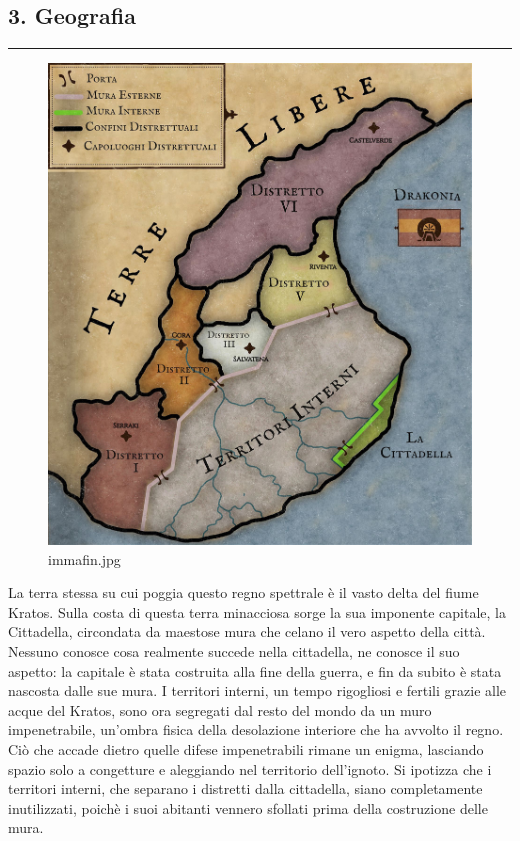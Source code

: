 \subsection{3. Geografia}\label{geografia}

\begin{center}\rule{0.5\linewidth}{0.5pt}\end{center}

\begin{figure}
\centering
\includegraphics{immafin.jpg}
\caption{immafin.jpg}
\end{figure}

La terra stessa su cui poggia questo regno spettrale è il vasto delta
del fiume Kratos. Sulla costa di questa terra minacciosa sorge la sua
imponente capitale, la Cittadella, circondata da maestose mura che
celano il vero aspetto della città. Nessuno conosce cosa realmente
succede nella cittadella, ne conosce il suo aspetto: la capitale è stata
costruita alla fine della guerra, e fin da subito è stata nascosta dalle
sue mura. I territori interni, un tempo rigogliosi e fertili grazie alle
acque del Kratos, sono ora segregati dal resto del mondo da un muro
impenetrabile, un'ombra fisica della desolazione interiore che ha
avvolto il regno. Ciò che accade dietro quelle difese impenetrabili
rimane un enigma, lasciando spazio solo a congetture e aleggiando nel
territorio dell'ignoto. Si ipotizza che i territori interni, che
separano i distretti dalla cittadella, siano completamente inutilizzati,
poichè i suoi abitanti vennero sfollati prima della costruzione delle
mura.

